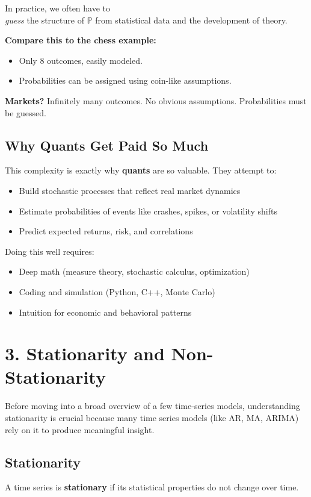 \documentclass[10pt]{article}
\begin{document}
	In practice, we often have to \\
	\textit{guess} the structure of \( \mathbb{P} \) from statistical data and the development of theory.
	
	\textbf{Compare this to the chess example:}
	\begin{itemize}
		\item Only 8 outcomes, easily modeled.
		\item Probabilities can be assigned using coin-like assumptions.
	\end{itemize}
	
	\textbf{Markets?} Infinitely many outcomes. No obvious assumptions. Probabilities must be guessed.
	
	\subsection*{Why Quants Get Paid So Much}
	This complexity is exactly why \textbf{quants} are so valuable. They attempt to:
	\begin{itemize}
		\item Build stochastic processes that reflect real market dynamics
		\item Estimate probabilities of events like crashes, spikes, or volatility shifts
		\item Predict expected returns, risk, and correlations
	\end{itemize}
	
	Doing this well requires:
	\begin{itemize}
		\item Deep math (measure theory, stochastic calculus, optimization)
		\item Coding and simulation (Python, C++, Monte Carlo)
		\item Intuition for economic and behavioral patterns
	\end{itemize}
	
\section*{3. Stationarity and Non-Stationarity}

Before moving into a broad overview of a few time-series models, understanding stationarity is crucial because many time series models (like AR, MA, ARIMA) rely on it to produce meaningful insight.

\subsection*{Stationarity}
A time series is \textbf{stationary} if its statistical properties do not change over time.
\end{document}
